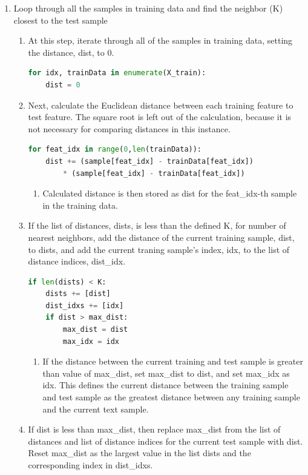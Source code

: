 \documentclass[11pt]{article}
\theoremstyle{definition}
\begin{document}
\begin{enumerate}
\begin{enumerate}
 \item Loop through all the samples in training data and find the neighbor (\textsf{K}) closest to the test sample
 \begin{enumerate}
     \item At this step, iterate through all of the samples in training data, setting the distance, \textsf{dist}, to 0.
\begin{lstlisting}[language=python, frame=single]
for idx, trainData in enumerate(X_train):
	dist = 0
\end{lstlisting}
     \item Next, calculate the Euclidean distance between each training feature to test feature. The square root is left out of the calculation, because it is not necessary for comparing distances in this instance. 
\begin{lstlisting}[language=python, frame=single]
for feat_idx in range(0,len(trainData)):
    dist += (sample[feat_idx] - trainData[feat_idx]) 
        * (sample[feat_idx] - trainData[feat_idx])
\end{lstlisting}
     \begin{enumerate}
     \item Calculated distance is then stored as \textsf{dist} for the \textsf{feat\_idx}-th sample in the training data.
     \end{enumerate}
    \item If the list of distances, \textsf{dists}, is less than the defined \textsf{K}, for number of nearest neighbors, add the distance of the current training sample, \textsf{dist}, to \textsf{dists}, and add the current traning sample's index, \textsf{idx}, to the list of distance indices, \textsf{dist\_idx}.
\begin{lstlisting}[language=python, frame=single]
if len(dists) < K:
    dists += [dist]
    dist_idxs += [idx]
    if dist > max_dist:
    	max_dist = dist
    	max_idx = idx
\end{lstlisting}
    \begin{enumerate}
        \item If the distance between the current training and test sample is greater than value of \textsf{max\_dist}, set \textsf{max\_dist} to \textsf{dist}, and set \textsf{max\_idx} as \textsf{idx}. This defines the current distance between the training sample and test sample as the greatest distance between any training sample and the current text sample.
    \end{enumerate}
    \item If \textsf{dist} is less than \textsf{max\_dist}, then replace \textsf{max\_dist} from the list of distances and list of distance indices for the current test sample with \textsf{dist}. Reset \textsf{max\_dist} as the largest value in the list \textsf{dists} and the corresponding index in \textsf{dist\_idxs}.

\end{enumerate}
\end{enumerate}
\end{enumerate}
\end{document}
